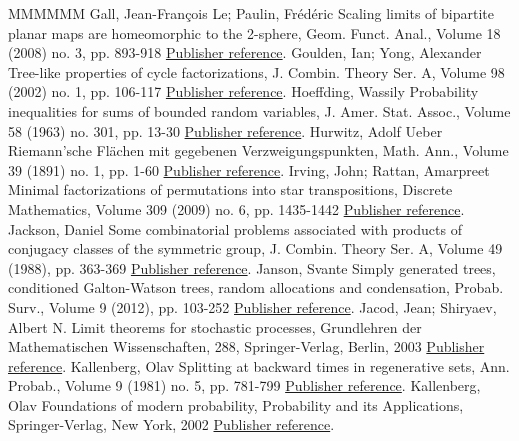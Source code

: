 \begin{thebibliography}{MMMMMM}
 Gall, Jean-François Le; Paulin, Frédéric Scaling limits of bipartite planar maps are homeomorphic to the 2-sphere, Geom. Funct. Anal., Volume 18 (2008) no. 3, pp. 893-918 \href{https://ahl.centre-mersenne.org/item/AHL_2018__1__149_0/#LGP08}{Publisher reference}.
 Goulden, Ian; Yong, Alexander Tree-like properties of cycle factorizations, J. Combin. Theory Ser. A, Volume 98 (2002) no. 1, pp. 106-117 \href{https://ahl.centre-mersenne.org/item/AHL_2018__1__149_0/#GY02}{Publisher reference}.
 Hoeffding, Wassily Probability inequalities for sums of bounded random variables, J. Amer. Stat. Assoc., Volume 58 (1963) no. 301, pp. 13-30 \href{https://ahl.centre-mersenne.org/item/AHL_2018__1__149_0/#Hoeffding}{Publisher reference}.
 Hurwitz, Adolf Ueber Riemann’sche Flächen mit gegebenen Verzweigungspunkten, Math. Ann., Volume 39 (1891) no. 1, pp. 1-60 \href{https://ahl.centre-mersenne.org/item/AHL_2018__1__149_0/#Hur91}{Publisher reference}.
 Irving, John; Rattan, Amarpreet Minimal factorizations of permutations into star transpositions, Discrete Mathematics, Volume 309 (2009) no. 6, pp. 1435-1442 \href{https://ahl.centre-mersenne.org/item/AHL_2018__1__149_0/#IrvingRattan2009}{Publisher reference}.
 Jackson, Daniel Some combinatorial problems associated with products of conjugacy classes of the symmetric group, J. Combin. Theory Ser. A, Volume 49 (1988), pp. 363-369 \href{https://ahl.centre-mersenne.org/item/AHL_2018__1__149_0/#Jac88}{Publisher reference}.
 Janson, Svante Simply generated trees, conditioned Galton-Watson trees, random allocations and condensation, Probab. Surv., Volume 9 (2012), pp. 103-252 \href{https://ahl.centre-mersenne.org/item/AHL_2018__1__149_0/#Jan12}{Publisher reference}.
 Jacod, Jean; Shiryaev, Albert N. Limit theorems for stochastic processes, Grundlehren der Mathematischen Wissenschaften, 288, Springer-Verlag, Berlin, 2003 \href{https://ahl.centre-mersenne.org/item/AHL_2018__1__149_0/#JS03}{Publisher reference}.
 Kallenberg, Olav Splitting at backward times in regenerative sets, Ann. Probab., Volume 9 (1981) no. 5, pp. 781-799 \href{https://ahl.centre-mersenne.org/item/AHL_2018__1__149_0/#Kal81}{Publisher reference}.
 Kallenberg, Olav Foundations of modern probability, Probability and its Applications, Springer-Verlag, New York, 2002 \href{https://ahl.centre-mersenne.org/item/AHL_2018__1__149_0/#Kal02}{Publisher reference}.

\end{thebibliography}
